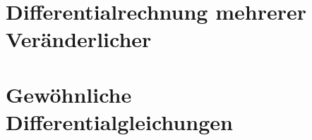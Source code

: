 \pagebreak

\section{Differentialrechnung mehrerer Veränderlicher}

\pagebreak

\section{Gewöhnliche Differentialgleichungen}